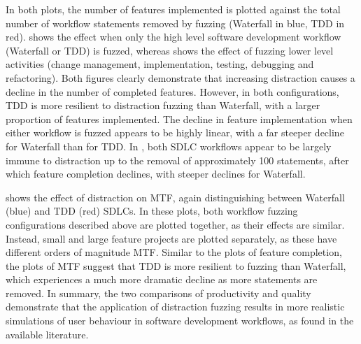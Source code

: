 \documentclass{llncs}
\begin{document}
%
In both plots, the number of features implemented is plotted against the total number of workflow statements removed by
fuzzing (Waterfall in blue, TDD in red).  shows the effect when only the high level
software development workflow (Waterfall or TDD) is fuzzed, whereas  shows the effect
of fuzzing lower level activities (change management, implementation, testing, debugging and refactoring). Both figures
clearly demonstrate that increasing distraction causes a decline in the number of completed features. However, in both
configurations, TDD is more resilient to distraction fuzzing than Waterfall, with a larger proportion of features
implemented. The decline in feature implementation when either workflow is fuzzed appears to be highly linear, with a
far steeper decline for Waterfall than for TDD. In , both SDLC workflows appear to be largely
immune to distraction up to the removal of approximately 100 statements, after which feature completion declines, with
steeper declines for Waterfall.

 shows the effect of distraction on MTF, again distinguishing between Waterfall (blue) and TDD
(red) SDLCs.  In these plots, both workflow fuzzing configurations described above are plotted together, as their
effects are similar.  Instead, small and large feature projects are plotted separately, as these have different orders
of magnitude MTF.  Similar to the plots of feature completion, the plots of MTF suggest that TDD is more resilient to
fuzzing than Waterfall, which experiences a much more dramatic decline as more statements are removed.  In summary, the
two comparisons of productivity and quality demonstrate that the application of distraction fuzzing results in more
realistic simulations of user behaviour in software development workflows, as found in the available literature.
\end{document}
